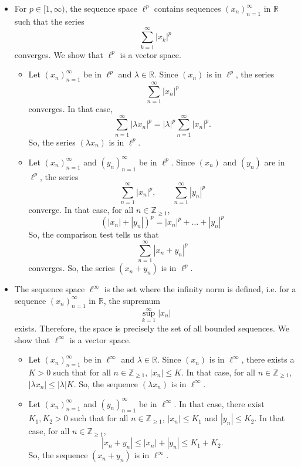\documentclass[a4paper, openany]{memoir}
\theoremstyle{definition}
\theoremstyle{plain}
\begin{document}
\begin{itemize}
    \item For $p \in [1, \infty)$, the sequence space $\ell^p$ contains sequences $(x_n)_{n=1}^\infty$ in $\mathbb{R}$ such that the series
    \[\sum_{k=1}^\infty |x_k|^p\]
    converges. We show that $\ell^p$ is a vector space.
    \begin{itemize}
        \item Let $(x_n)_{n=1}^\infty$ be in $\ell^p$ and $\lambda \in \mathbb{R}$. Since $(x_n)$ is in $\ell^p$, the series
        \[\sum_{n=1}^\infty |x_n|^p\]
        converges. In that case,
        \[\sum_{n=1}^\infty |\lambda x_n|^p = |\lambda|^p \sum_{n=1}^\infty |x_n|^p.\]
        So, the series $(\lambda x_n)$ is in $\ell^p$.

        \item Let $(x_n)_{n=1}^\infty$ and $(y_n)_{n=1}^\infty$ be in $\ell^p$. Since $(x_n)$ and $(y_n)$ are in $\ell^p$, the series
        \[\sum_{n=1}^\infty |x_n|^p, \qquad \sum_{n=1}^\infty |y_n|^p\]
        converge. In that case, for all $n \in \mathbb{Z}_{\geq 1}$,
        \[(|x_n| + |y_n|)^p = |x_n|^p + \dots + |y_n|^p \]
        So, the comparison test tells us that
        \[\sum_{n=1}^\infty |x_n + y_n|^p \]
        converges. So, the series $(x_n + y_n)$ is in $\ell^p$.
    \end{itemize}

    \item The sequence space $\ell^\infty$ is the set where the infinity norm is defined, i.e. for a sequence $(x_n)_{n=1}^\infty$ in $\mathbb{R}$, the supremum
    \[\sup_{k=1}^\infty |x_n|\]
    exists. Therefore, the space is precisely the set of all bounded sequences. We show that $\ell^\infty$ is a vector space.
    \begin{itemize}
        \item Let $(x_n)_{n=1}^\infty$ be in $\ell^\infty$ and $\lambda \in \mathbb{R}$. Since $(x_n)$ is in $\ell^\infty$, there exists a $K > 0$ such that for all $n \in \mathbb{Z}_{\geq 1}$, $|x_n| \leq K$. In that case, for all $n \in \mathbb{Z}_{\geq 1}$, $|\lambda x_n| \leq |\lambda| K$. So, the sequence $(\lambda x_n)$ is in $\ell^\infty$.
        \item Let $(x_n)_{n=1}^\infty$ and $(y_n)_{n=1}^\infty$ be in $\ell^\infty$. In that case, there exist $K_1, K_2 > 0$ such that for all $n \in \mathbb{Z}_{\geq 1}$, $|x_n| \leq K_1$ and $|y_n| \leq K_2$. In that case, for all $n \in \mathbb{Z}_{\geq 1}$, 
        \[|x_n + y_n| \leq |x_n| + |y_n| \leq K_1 + K_2.\]
        So, the sequence $(x_n + y_n)$ is in $\ell^\infty$.
    \end{itemize}


\end{itemize}
\end{document}
